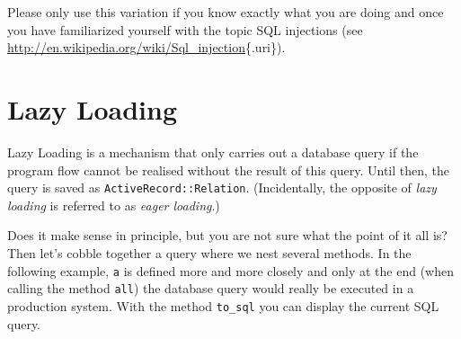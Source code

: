 \documentclass[a4paper]{book}
\newcounter{tab}[chapter]
\begin{document}
Please only use this variation if you know exactly what you are doing and once you have familiarized yourself with the topic SQL injections (see \url{http://en.wikipedia.org/wiki/Sql_injection}\{.uri\}).

\section{Lazy Loading}\label{lazy-loading}

Lazy Loading is a mechanism that only carries out a database query if the program flow cannot be realised without the result of this query. Until then, the query is saved as \texttt{ActiveRecord::Relation}. (Incidentally, the opposite of \emph{lazy loading} is referred to as \emph{eager loading}.)

Does it make sense in principle, but you are not sure what the point of it all is? Then let's cobble together a query where we nest several methods. In the following example, \texttt{a} is defined more and more closely and only at the end (when calling the method \texttt{all}) the database query would really be executed in a production system. With the method \texttt{to\_sql} you can display the current SQL query.
\end{document}
